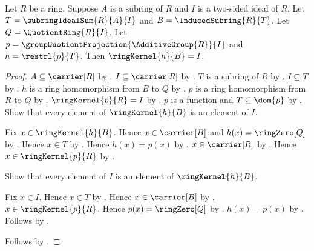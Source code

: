 \begin{theorem}\label{ring_second_isomorphism_ambient_restriction_kernel}
    Let $R$ be a ring.
    Suppose $A$ is a subring of $R$ and
        $I$ is a two-sided ideal of $R$.
    Let $T=\subringIdealSum{R}{A}{I}$ and
        $B=\InducedSubring{R}{T}$.
    Let $Q=\QuotientRing{R}{I}$.
    Let $p=\groupQuotientProjection{\AdditiveGroup{R}}{I}$ and
        $h=\restrl{p}{T}$.
    Then $\ringKernel{h}{B}=I$.
\end{theorem}
\begin{proof}
    $A\subseteq\carrier[R]$ by .
    $I\subseteq\carrier[R]$ by
        .
    $T$ is a subring of $R$ by .
    $I\subseteq T$ by .
    $h$ is a ring homomorphism from $B$ to $Q$ by
        .
    $p$ is a ring homomorphism from $R$ to $Q$ by
        .
    $\ringKernel{p}{R}=I$ by
        .
    $p$ is a function and $T\subseteq\dom{p}$ by
        .
    Show that every element of $\ringKernel{h}{B}$ is an element
        of $I$.
    \begin{subproof}
        Fix $x\in\ringKernel{h}{B}$.
        Hence $x\in\carrier[B]$ and $h(x)=\ringZero[Q]$ by
            .
        Hence $x\in T$ by .
        Hence $h(x)=p(x)$ by .
        $x\in\carrier[R]$ by
            .
        Hence $x\in\ringKernel{p}{R}$ by
            .
    \end{subproof}
    Show that every element of $I$ is an element of
        $\ringKernel{h}{B}$.
    \begin{subproof}
        Fix $x\in I$.
        Hence $x\in T$ by .
        Hence $x\in\carrier[B]$ by .
        $x\in\ringKernel{p}{R}$.
        Hence $p(x)=\ringZero[Q]$ by .
        $h(x)=p(x)$ by .
        Follows by .
    \end{subproof}
    Follows by .
\end{proof}


